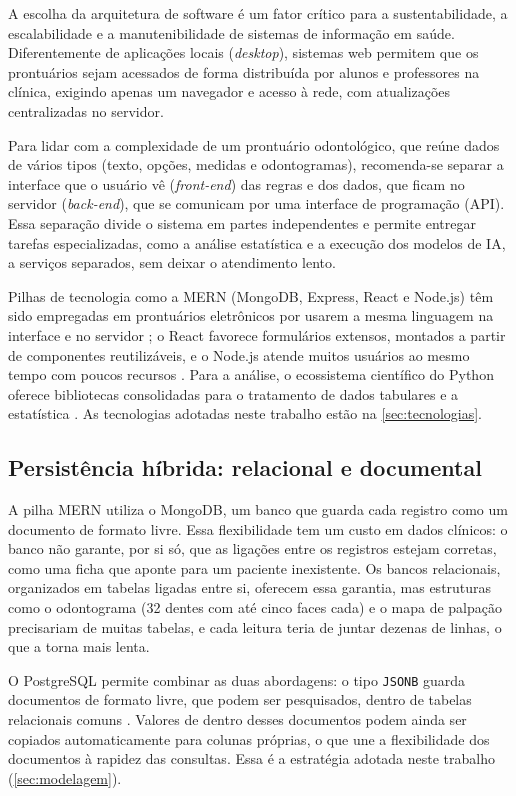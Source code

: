 A escolha da arquitetura de software é um fator crítico para a sustentabilidade, a escalabilidade e a manutenibilidade de sistemas de informação em saúde. Diferentemente de aplicações locais (\textit{desktop}), sistemas web permitem que os prontuários sejam acessados de forma distribuída por alunos e professores na clínica, exigindo apenas um navegador e acesso à rede, com atualizações centralizadas no servidor.

Para lidar com a complexidade de um prontuário odontológico, que reúne dados de vários tipos (texto, opções, medidas e odontogramas), recomenda-se separar a interface que o usuário vê (\textit{front-end}) das regras e dos dados, que ficam no servidor (\textit{back-end}), que se comunicam por uma interface de programação (API). Essa separação divide o sistema em partes independentes e permite entregar tarefas especializadas, como a análise estatística e a execução dos modelos de IA, a serviços separados, sem deixar o atendimento lento.

Pilhas de tecnologia como a MERN (MongoDB, Express, React e Node.js) têm sido empregadas em prontuários eletrônicos por usarem a mesma linguagem na interface e no servidor \cite{singhal2025}; o React favorece formulários extensos, montados a partir de componentes reutilizáveis, e o Node.js atende muitos usuários ao mesmo tempo com poucos recursos \cite{parida2024}. Para a análise, o ecossistema científico do Python oferece bibliotecas consolidadas para o tratamento de dados tabulares e a estatística \cite{mckinney2010,virtanen2020}. As tecnologias adotadas neste trabalho estão na \autoref{sec:tecnologias}.

\subsection{Persistência híbrida: relacional e documental}
\label{sec:jsonb}

A pilha MERN utiliza o MongoDB, um banco que guarda cada registro como um documento de formato livre. Essa flexibilidade tem um custo em dados clínicos: o banco não garante, por si só, que as ligações entre os registros estejam corretas, como uma ficha que aponte para um paciente inexistente. Os bancos relacionais, organizados em tabelas ligadas entre si, oferecem essa garantia, mas estruturas como o odontograma (32 dentes com até cinco faces cada) e o mapa de palpação precisariam de muitas tabelas, e cada leitura teria de juntar dezenas de linhas, o que a torna mais lenta.

O PostgreSQL permite combinar as duas abordagens: o tipo \texttt{JSONB} guarda documentos de formato livre, que podem ser pesquisados, dentro de tabelas relacionais comuns \cite{postgres-json}. Valores de dentro desses documentos podem ainda ser copiados automaticamente para colunas próprias, o que une a flexibilidade dos documentos à rapidez das consultas. Essa é a estratégia adotada neste trabalho (\autoref{sec:modelagem}).

